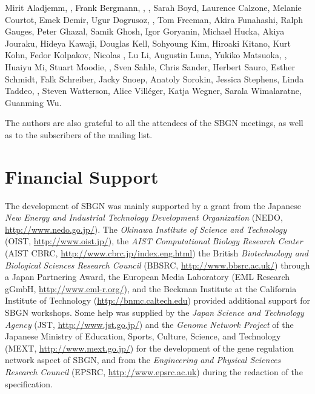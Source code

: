 Mirit Aladjemm, , Frank Bergmann, , , Sarah Boyd, Laurence Calzone, Melanie Courtot, Emek Demir, Ugur Dogrusoz, , Tom Freeman, Akira Funahashi, Ralph Gauges, Peter Ghazal, Samik Ghosh, Igor Goryanin, Michael Hucka, Akiya Jouraku, Hideya Kawaji, Douglas Kell, Sohyoung Kim, Hiroaki Kitano, Kurt Kohn, Fedor Kolpakov, Nicolas \lenov{}, Lu Li, Augustin Luna, Yukiko Matsuoka, , Huaiyu Mi, Stuart Moodie, , Sven Sahle, Chris Sander, Herbert Sauro, Esther Schmidt, Falk Schreiber, Jacky Snoep, Anatoly Sorokin, Jessica Stephens, Linda Taddeo, , Steven Watterson, Alice Vill\'{e}ger, Katja Wegner, Sarala Wimalaratne, Guanming Wu.

The authors are also grateful to all the attendees of the SBGN meetings, as 
well as to the subscribers of the  mailing list.


\section{Financial Support}

The development of SBGN was mainly supported by a grant from the Japanese \emph{New Energy and Industrial Technology Development Organization} (NEDO, \url{http://www.nedo.go.jp/}).  The \emph{Okinawa Institute of Science and Technology} (OIST, \url{http://www.oist.jp/}), the \emph{AIST Computational Biology Research Center} (AIST CBRC, \url{http://www.cbrc.jp/index.eng.html}) the British \emph{Biotechnology and Biological Sciences Research Council} (BBSRC, \url{http://www.bbsrc.ac.uk/}) through a Japan Partnering Award, the European Media Laboratory (EML Research gGmbH, \url{http://www.eml-r.org/}), and the Beckman Institute at the California Institute of Technology (\url{http://bnmc.caltech.edu}) provided additional support for SBGN workshops. Some help was supplied by the \emph{Japan Science and Technology Agency} (JST, \url{http://www.jst.go.jp/}) and the \emph{Genome Network Project} of the Japanese Ministry of Education, Sports, Culture, Science, and Technology (MEXT, \url{http://www.mext.go.jp/}) for the development of the gene regulation network aspect of SBGN, and from the \emph{Engineering and Physical Sciences Research Council} (EPSRC, \url{http://www.epsrc.ac.uk}) during the redaction of the specification. 
